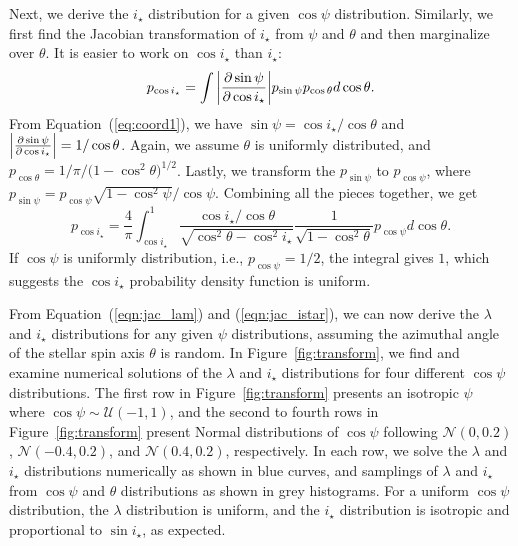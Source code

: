 \documentclass[twocolumn,times]{aastex631}
\begin{document}
Next, we derive the $i_\star$ distribution for a given $\cos{\psi}$ distribution. Similarly, we first find the Jacobian transformation of $i_\star$ from $\psi$ and $\theta$ and then marginalize over $\theta$. It is easier to work on $\cos{i_\star}$ than $i_\star$:
\begin{equation}
    p_{\cos{i_\star}} = \int \abs{\pdv{\sin{\psi}}{\cos{i_\star}}} p_{\sin{\psi}} p_{\cos{\theta}} d\cos{\theta}.
\end{equation}
From Equation~(\ref{eq:coord1}), we have $\sin{\psi} = \cos{i_\star}/\cos{\theta}$ and $\abs{\pdv{\sin{\psi}}{\cos{i_\star}}} = 1/\cos{\theta}$. Again, we assume $\theta$ is uniformly distributed, and $p_{\cos{\theta}} = 1/\pi/(1-\cos^2{\theta)^{1/2}}$. Lastly, we transform the $p_{\sin{\psi}}$ to $p_{\cos{\psi}}$, where $p_{\sin{\psi}} = p_{\cos{\psi}}\sqrt{1-\cos^2{\psi}}/\cos{\psi}$. Combining all the pieces together, we get
\begin{equation}\label{eqn:jac_istar}
    p_{\cos{i_\star}} = \frac{4}{\pi} \int_{\cos{i_\star}}^{1} \frac{\cos{i_\star}/\cos{\theta}}{\sqrt{\cos^2{\theta}-\cos^2{i_\star}}} \frac{1}{\sqrt{1-\cos^2{\theta}}} p_{\cos{\psi}} d\cos{\theta}.
\end{equation}
If $\cos{\psi}$ is uniformly distribution, i.e., $p_{\cos{\psi}} = 1/2$, the integral gives $1$, which suggests the $\cos{i_\star}$ probability density function is uniform.

From Equation~(\ref{eqn:jac_lam}) and (\ref{eqn:jac_istar}), we can now derive the $\lambda$ and $i_\star$ distributions for any given $\psi$ distributions, assuming the azimuthal angle of the stellar spin axis $\theta$ is random. In Figure~\ref{fig:transform}, we find and examine numerical solutions of the $\lambda$ and $i_\star$ distributions for four different $\cos{\psi}$ distributions. The first row in Figure~\ref{fig:transform} presents an isotropic $\psi$ where $\cos{\psi} \sim \mathcal{U}(-1,1)$, and the second to fourth rows in Figure~\ref{fig:transform} present Normal distributions of $\cos{\psi}$ following $\mathcal{N}(0,0.2)$, $\mathcal{N}(-0.4,0.2)$, and $\mathcal{N}(0.4,0.2)$, respectively. In each row, we solve the $\lambda$ and $i_\star$ distributions numerically as shown in blue curves, and samplings of $\lambda$ and $i_\star$ from $\cos{\psi}$ and $\theta$ distributions as shown in grey histograms. For a uniform $\cos{\psi}$ distribution, the $\lambda$ distribution is uniform, and the $i_\star$ distribution is isotropic and proportional to $\sin{i_\star}$, as expected.
\end{document}
